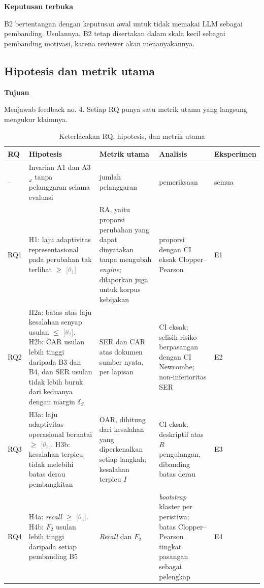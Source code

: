 \documentclass[journal,a4paper]{IEEEtran}
\newcommand{\en}[1]{\textit{#1}}
\newif\ifrancangan \rancangantrue
\newcommand{\kotak}[3]{\ifrancangan\par\begingroup\scriptsize
  \def\FrameCommand{\fboxsep=3pt\fboxrule=0.4pt\fcolorbox{#1!60!black}{#1!6}}%
  \MakeFramed{\advance\hsize-\width\FrameRestore}\noindent\textbf{#2}\par #3\endMakeFramed\endgroup\fi}
\newcommand{\tujuan}[1]{\kotak{blue}{Tujuan}{#1}}
\newcommand{\keputusan}[1]{\kotak{orange}{Keputusan terbuka}{#1}}
\newcommand{\isian}[1]{\ifrancangan\textcolor{gray}{[#1]}\fi}
\begin{document}
\keputusan{B2 bertentangan dengan keputusan awal untuk tidak memakai LLM sebagai pembanding. Usulannya, B2 tetap disertakan dalam skala kecil sebagai pembanding motivasi, karena reviewer akan menanyakannya.}

\subsection{Hipotesis dan metrik utama}
\tujuan{Menjawab feedback no. 4. Setiap RQ punya satu metrik utama yang langsung mengukur klaimnya.}

\begin{table}[t]
\centering
\caption{Keterlacakan RQ, hipotesis, dan metrik utama}
\label{tab:lacak}
\scriptsize
\begin{tabularx}{\textwidth}{@{}P{0.8cm} L P{4.0cm} P{3.4cm} P{1.3cm}@{}}
\toprule
\textbf{RQ} & \textbf{Hipotesis} & \textbf{Metrik utama} & \textbf{Analisis} & \textbf{Eksperimen} \\
\midrule
-- & Invarian A1 dan A3$_\omega$ tanpa pelanggaran selama evaluasi & jumlah pelanggaran & pemeriksaan & semua \\
RQ1 & H1: laju adaptivitas representasional pada perubahan tak terlihat $\geq$ \isian{$\theta_1$} & RA, yaitu proporsi perubahan yang dapat dinyatakan tanpa mengubah \en{engine}; dilaporkan juga untuk korpus kebijakan & proporsi dengan CI eksak Clopper--Pearson & E1 \\
RQ2 & H2a: batas atas laju kesalahan senyap usulan $\leq$ \isian{$\theta_2$}. H2b: CAR usulan lebih tinggi daripada B3 dan B4, dan SER usulan tidak lebih buruk dari keduanya dengan margin $\delta_S$ & SER dan CAR atas dokumen sumber nyata, per lapisan & CI eksak; selisih risiko berpasangan dengan CI Newcombe; non-inferioritas SER & E2 \\
RQ3 & H3a: laju adaptivitas operasional berantai $\geq$ \isian{$\theta_3$}. H3b: kesalahan terpicu tidak melebihi batas derau pembangkitan & OAR, dihitung dari kesalahan yang diperkenalkan setiap langkah; kesalahan terpicu $I$ & CI eksak; deskriptif atas $R$ pengulangan, dibanding batas derau & E3 \\
RQ4 & H4a: \en{recall} $\geq$ \isian{$\theta_4$}. H4b: $F_2$ usulan lebih tinggi daripada setiap pembanding B5 & \en{Recall} dan $F_2$ & \en{bootstrap} klaster per peristiwa; batas Clopper--Pearson tingkat pasangan sebagai pelengkap & E4 \\
\bottomrule
\end{tabularx}
\end{table}
\end{document}
